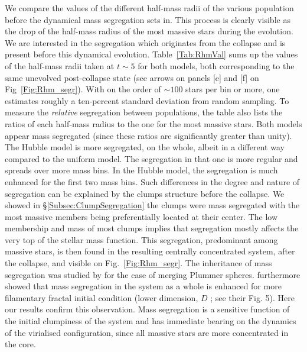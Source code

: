 We compare the values of the different half-mass radii of the various population before the dynamical mass segregation sets in. This process is clearly visible as the drop of the half-mass radius of the most massive stars during the evolution. We are interested in the segregation which originates from the collapse and is present before this dynamical evolution. Table~\ref{Tab:RhmVal} sums up the values of the half-mass radii taken at $t\sim5$ for both models, both corresponding to the same unevolved post-collapse state (see arrows on panels [e] and [f] on Fig~\ref{Fig:Rhm_segr}). With on the order of $\sim 100$ stars per bin or more, one estimates roughly a ten-percent standard deviation from random sampling. To measure the \textit{relative} segregation between populations, the table also lists the ratios of each half-mass radius to the one for the most massive stars. Both models appear mass segregated (since these ratios are significantly greater than unity). The Hubble model is more segregated, on the whole, albeit in a different way compared to the uniform model. The segregation in that one is more regular and spreads over more mass bins. In the Hubble model, the segregation is much enhanced for the first two mass bins. Such differences in the degree and nature of segregation can be explained by the clumps structure before the collapse. We showed in \S\ref{Subsec:ClumpSegregation} the clumps were mass segregated with the most massive members being preferentially located at their center. The low membership and mass of most clumps implies that segregation mostly affects the very top of the stellar mass function. This segregation, predominant among massive stars, is then found in the resulting centrally concentrated system, after the collapse, and visible on Fig.~\ref{Fig:Rhm_segr}. The inheritance of mass segregation was studied by \cite{mcmillan07} for the case of merging Plummer spheres. \cite{allison10} furthermore showed that mass segregation in the system as a whole is enhanced for more filamentary  fractal initial condition (lower dimension, $D$ ; see their Fig. 5). Here our results confirm this observation. Mass segregation is a sensitive function of the initial clumpiness of the system and has immediate bearing on the dynamics of the virialised configuration, since all massive stars are more concentrated in the core.